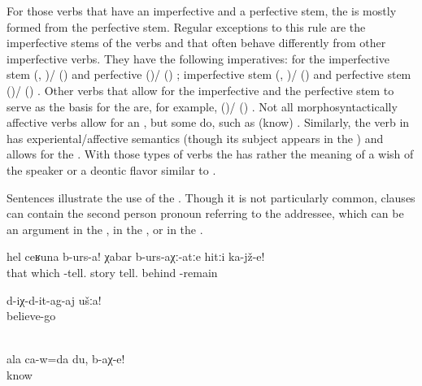 For those verbs that have an imperfective and a perfective stem, the  is mostly formed from the perfective stem. Regular exceptions to this rule are the imperfective stems of the verbs  and  that often behave differently from other imperfective verbs. They have the following imperatives: for the imperfective stem  (, )\slash{} ()  and perfective  ()\slash{} () ; imperfective stem  (, )\slash{} ()  and perfective stem  ()\slash{} () . Other verbs that allow for the imperfective and the perfective stem to serve as the basis for the  are, for example,  ()\slash{} () . Not all morphosyntactically affective verbs allow for an , but some do, such as  (know) . Similarly, the verb in  has experiental\slash affective semantics (though its subject appears in the ) and allows for the . With those types of verbs the  has rather the meaning of a wish of the speaker or a deontic flavor similar to .

Sentences  illustrate the use of the . Though it is not particularly common,  clauses can contain the second person pronoun referring to the addressee, which can be an argument in the  , in the  , or in the .

\begin{exe}
	\ex	\label{ex:‎Tell it like this}
	\gll	hel	ceʁuna	b-urs-a!	χabar		b-urs-aχː-atːe	hitːi	ka-jž-e!\\
		that	which	-tell.	story	tell.	behind	-remain\\
	\glt	{}

	\ex	\label{ex:You pl believe me}
	\gll	d-iχ-d-it-ag-aj	ušːa!\\
		believe-go	\\
		\\
	\glt	{}

	\ex	\label{ex:I am yours, (you) know}
	\gll	ala	ca-w=da	du,	b-aχ-e!\\
					know\\
	\glt	{}
\end{exe}

